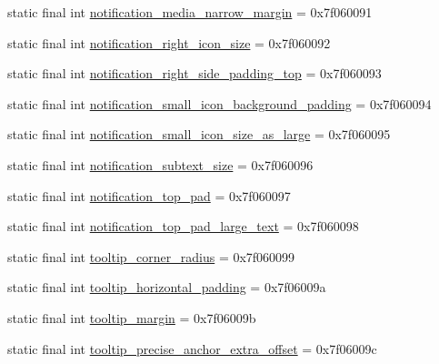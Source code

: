 \begin{DoxyCompactItemize}
static final int \mbox{\hyperlink{classandroid_1_1support_1_1v7_1_1appcompat_1_1R_1_1dimen_a20fbbaea6c3a0c44f12f50b8ffbf709c}{notification\+\_\+media\+\_\+narrow\+\_\+margin}} = 0x7f060091
\item 
static final int \mbox{\hyperlink{classandroid_1_1support_1_1v7_1_1appcompat_1_1R_1_1dimen_a66bc270c52a9288abdf7fd72d9cfa019}{notification\+\_\+right\+\_\+icon\+\_\+size}} = 0x7f060092
\item 
static final int \mbox{\hyperlink{classandroid_1_1support_1_1v7_1_1appcompat_1_1R_1_1dimen_a9b2845b7b3037785d47ed7992607a328}{notification\+\_\+right\+\_\+side\+\_\+padding\+\_\+top}} = 0x7f060093
\item 
static final int \mbox{\hyperlink{classandroid_1_1support_1_1v7_1_1appcompat_1_1R_1_1dimen_aad972e44f05ad45d730db47c1ad1b4d5}{notification\+\_\+small\+\_\+icon\+\_\+background\+\_\+padding}} = 0x7f060094
\item 
static final int \mbox{\hyperlink{classandroid_1_1support_1_1v7_1_1appcompat_1_1R_1_1dimen_af52f53608c63a8bbd9bd8701a3e8da49}{notification\+\_\+small\+\_\+icon\+\_\+size\+\_\+as\+\_\+large}} = 0x7f060095
\item 
static final int \mbox{\hyperlink{classandroid_1_1support_1_1v7_1_1appcompat_1_1R_1_1dimen_a22988b81668da9a88c915c93f07a65dc}{notification\+\_\+subtext\+\_\+size}} = 0x7f060096
\item 
static final int \mbox{\hyperlink{classandroid_1_1support_1_1v7_1_1appcompat_1_1R_1_1dimen_ae060f34af02cf912b87ebcda2a9619e9}{notification\+\_\+top\+\_\+pad}} = 0x7f060097
\item 
static final int \mbox{\hyperlink{classandroid_1_1support_1_1v7_1_1appcompat_1_1R_1_1dimen_ac95b1a932a72277a2a90b0ed26ee66ac}{notification\+\_\+top\+\_\+pad\+\_\+large\+\_\+text}} = 0x7f060098
\item 
static final int \mbox{\hyperlink{classandroid_1_1support_1_1v7_1_1appcompat_1_1R_1_1dimen_ab101a93216f889202e7b50ad1ca5976b}{tooltip\+\_\+corner\+\_\+radius}} = 0x7f060099
\item 
static final int \mbox{\hyperlink{classandroid_1_1support_1_1v7_1_1appcompat_1_1R_1_1dimen_a81be92348ba30432978e549e2330b8ca}{tooltip\+\_\+horizontal\+\_\+padding}} = 0x7f06009a
\item 
static final int \mbox{\hyperlink{classandroid_1_1support_1_1v7_1_1appcompat_1_1R_1_1dimen_a7ed8b140f62a9b032f5981baf889468e}{tooltip\+\_\+margin}} = 0x7f06009b
\item 
static final int \mbox{\hyperlink{classandroid_1_1support_1_1v7_1_1appcompat_1_1R_1_1dimen_a28345e187cf8fe67adb09f7f64199c68}{tooltip\+\_\+precise\+\_\+anchor\+\_\+extra\+\_\+offset}} = 0x7f06009c

\end{DoxyCompactItemize}
